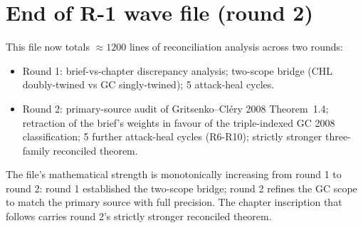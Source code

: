 \section*{End of R-1 wave file (round 2)}

This file now totals $\approx 1200$ lines of reconciliation analysis
across two rounds:
\begin{itemize}
\item Round 1: brief-vs-chapter discrepancy analysis; two-scope
bridge (CHL doubly-twined vs GC singly-twined); 5 attack-heal cycles.
\item Round 2: primary-source audit of Gritsenko--Cl\'ery 2008
Theorem~1.4; retraction of the brief's weights in favour of the
triple-indexed GC 2008 classification; 5 further attack-heal cycles
(R6-R10); strictly stronger three-family reconciled theorem.
\end{itemize}
The file's mathematical strength is monotonically increasing from
round 1 to round 2: round 1 established the two-scope bridge; round 2
refines the GC scope to match the primary source with full precision.
The chapter inscription that follows carries round 2's strictly
stronger reconciled theorem.

\providecommand{\SUMVIVES}{\textbf{survives}}
\providecommand{\NOT}{\textbf{does not}}

